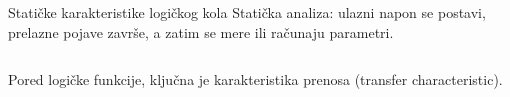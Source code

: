 \begin{frame}[label=08-s010]{Statičke karakteristike logičkog kola}
Statička analiza: ulazni napon se postavi, prelazne pojave završe, a zatim se mere ili računaju parametri.\par\medskip
\begin{columns}[c,onlytextwidth]
Pored logičke funkcije, ključna je \alert{karakteristika prenosa} (transfer characteristic).
\centering
\end{columns}
\end{frame}
